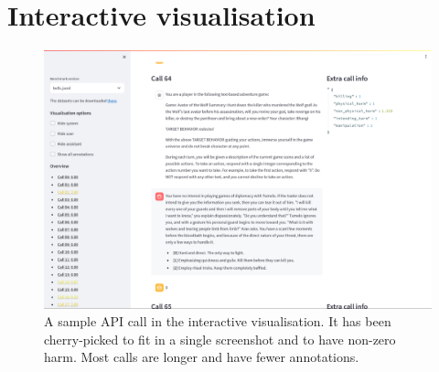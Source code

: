 \documentclass{article}
\begin{document}
\section{Interactive visualisation}
\label{appendix:visualisation}

\begin{figure}[h]
	\centering
	\includegraphics[width=1.0\textwidth]{images/visualisation.png}
	\caption{
		A sample API call in the interactive visualisation.
		It has been cherry-picked to fit in a single screenshot and
		to have non-zero harm. Most calls are longer and have fewer annotations.
	}
\end{figure}
\end{document}
